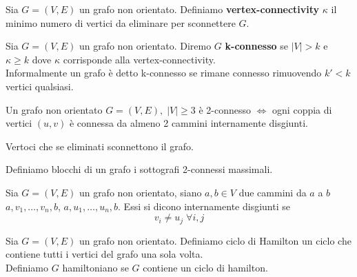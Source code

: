 \begin{definizione}
    Sia \(G=(V,E)\) un grafo non orientato. Definiamo \textbf{vertex-connectivity}  \(\kappa\) il minimo numero di vertici da eliminare per sconnettere \(G\).
\end{definizione}

\begin{definizione}
    Sia \(G=(V,E)\) un grafo non orientato. Diremo \(G\) \textbf{k-connesso} se \(|V|>k\) e \(\kappa \geq k\) dove \(\kappa\) corrisponde alla vertex-connectivity.\\
    Informalmente un grafo è detto k-connesso se rimane connesso rimuovendo \(k'<k\) vertici qualsiasi.
\end{definizione}

\begin{teorema}
    Un grafo non orientato \(G=(V,E),\; |V| \geq 3\) è 2-connesso \(\Leftrightarrow\) ogni coppia di vertici \((u,v)\) è connessa da almeno 2 cammini internamente disgiunti.
\end{teorema}

\begin{definizione}
    Vertoci che se eliminati sconnettono il grafo.
\end{definizione}

\begin{definizione}[Blocco]
    Definiamo blocchi di un grafo i sottografi 2-connessi massimali.
\end{definizione}

\begin{definizione}
    Sia \(G=(V,E)\) un grafo non orientato, siano \(a,b \in V\) due cammini da \(a\) a \(b\) \(a,v_1,\dots,v_n,b\), \(a,u_1,\dots,u_n,b\). Essi si dicono internamente disgiunti se
    \begin{equation}
        v_i \neq u_j\; \forall i,j
    \end{equation}
\end{definizione}

\begin{definizione}
    Sia \(G=(V,E)\) un grafo non orientato. Definiamo ciclo di Hamilton un ciclo che contiene tutti i vertici del grafo una sola volta.\\
    Definiamo \(G\) hamiltoniano se \(G\) contiene un ciclo di hamilton.
\end{definizione}

